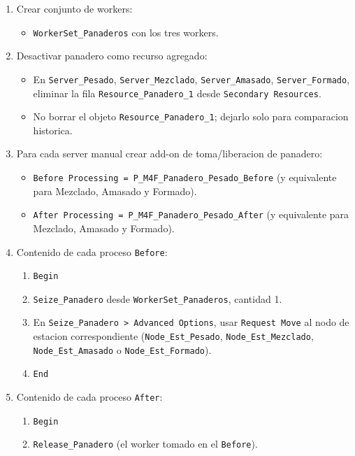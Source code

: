 \documentclass[11pt]{article}
\newcommand{\simio}[1]{\texttt{#1}}
\begin{document}
\begin{enumerate}
\begin{itemize}
    \item \simio{Sch\_Panadero\_3}: 09:00--17:30, colacion 13:30--14:00.
  \end{itemize}
  \item Crear conjunto de workers:
  \begin{itemize}
    \item \simio{WorkerSet\_Panaderos} con los tres workers.
  \end{itemize}
  \item Desactivar panadero como recurso agregado:
  \begin{itemize}
    \item En \simio{Server\_Pesado}, \simio{Server\_Mezclado}, \simio{Server\_Amasado}, \simio{Server\_Formado}, eliminar la fila \simio{Resource\_Panadero\_1} desde \simio{Secondary Resources}.
    \item No borrar el objeto \simio{Resource\_Panadero\_1}; dejarlo solo para comparacion historica.
  \end{itemize}
  \item Para cada server manual crear add-on de toma/liberacion de panadero:
  \begin{itemize}
    \item \simio{Before Processing = P\_M4F\_Panadero\_Pesado\_Before} (y equivalente para Mezclado, Amasado y Formado).
    \item \simio{After Processing = P\_M4F\_Panadero\_Pesado\_After} (y equivalente para Mezclado, Amasado y Formado).
  \end{itemize}
  \item Contenido de cada proceso \simio{Before}:
  \begin{enumerate}
    \item \simio{Begin}
    \item \simio{Seize\_Panadero} desde \simio{WorkerSet\_Panaderos}, cantidad 1.
    \item En \simio{Seize\_Panadero > Advanced Options}, usar \simio{Request Move} al nodo de estacion correspondiente (\simio{Node\_Est\_Pesado}, \simio{Node\_Est\_Mezclado}, \simio{Node\_Est\_Amasado} o \simio{Node\_Est\_Formado}).
    \item \simio{End}
  \end{enumerate}
  \item Contenido de cada proceso \simio{After}:
  \begin{enumerate}
    \item \simio{Begin}
    \item \simio{Release\_Panadero} (el worker tomado en el \simio{Before}).

\end{enumerate}
\end{enumerate}
\end{document}
